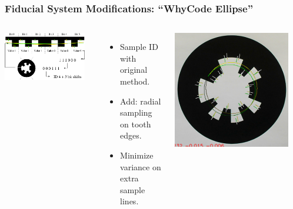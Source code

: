 \documentclass[aspectratio=169]{rubeamer}
\newif\ifpause
\newcommand{\mypause}{\ifpause \pause \fi}
\begin{document}
\begin{frame}
  \frametitle{Fiducial System Modifications: ``WhyCode Ellipse''}

  \begin{columns}
    \includegraphics[width=0.9\textwidth]{whycode_layout_with_sample_lines_ellipse}
    \begin{itemize}
      \mypause
      \item Sample ID with original method.
      \mypause
      \item Add: radial sampling on tooth edges.
      \mypause
      \item Minimize variance on extra sample lines.
    \end{itemize}
    \centering
    \onslide
    \includegraphics[width=0.9\textwidth]{whycode_ellipse_both_solutions_cropped}\\
  \end{columns}
\end{frame}
\end{document}
